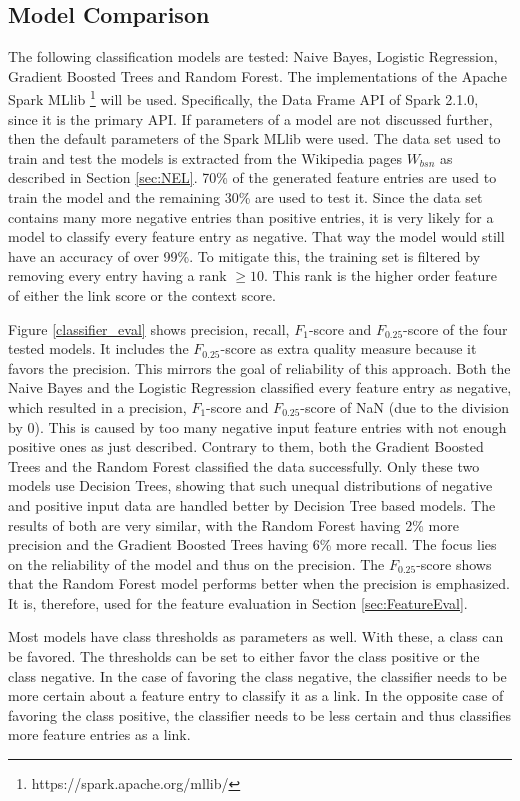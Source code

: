 \subsection{Model Comparison}
The following classification models are tested: Naive Bayes, Logistic Regression, Gradient Boosted Trees and Random Forest. The implementations of the Apache Spark MLlib \footnote{https://spark.apache.org/mllib/} will be used. Specifically, the Data Frame API of Spark 2.1.0, since it is the primary API. If parameters of a model are not discussed further, then the default parameters of the Spark  MLlib were used. The data set used to train and test the models is extracted from the Wikipedia pages $W_{bsn}$ as described in Section \ref{sec:NEL}. 70\% of the generated feature entries are used to train the model and the remaining 30\% are used to test it. Since the data set contains many more negative entries than positive entries, it is very likely for a model to classify every feature entry as negative. That way the model would still have an accuracy of over 99\%. To mitigate this, the training set is filtered by removing every entry having a rank $\geq 10$. This rank is the higher order feature of either the link score or the context score.\par
Figure \ref{classifier_eval} shows precision, recall, $F_1$-score and $F_{0.25}$-score of the four tested models. It includes the $F_{0.25}$-score as extra quality measure because it favors the precision. This mirrors the goal of reliability of this approach. Both the Naive Bayes and the Logistic Regression classified every feature entry as negative, which resulted in a precision, $F_1$-score and $F_{0.25}$-score of NaN (due to the division by 0). This is caused by too many negative input feature entries with not enough positive ones as just described. Contrary to them, both the Gradient Boosted Trees and the Random Forest classified the data successfully. Only these two models use Decision Trees, showing that such unequal distributions of negative and positive input data are handled better by Decision Tree based models. The results of both are very similar, with the Random Forest having 2\% more precision and the Gradient Boosted Trees having 6\% more recall. The focus lies on the reliability of the model and thus on the precision. The $F_{0.25}$-score shows that the Random Forest model performs better when the precision is emphasized. It is, therefore, used for the feature evaluation in Section \ref{sec:FeatureEval}.\par
Most models have class thresholds as parameters as well. With these, a class can be favored. The thresholds can be set to either favor the class positive or the class negative. In the case of favoring the class negative, the classifier needs to be more certain about a feature entry to classify it as a link. In the opposite case of favoring the class positive, the classifier needs to be less certain and thus classifies more feature entries as a link.\par
